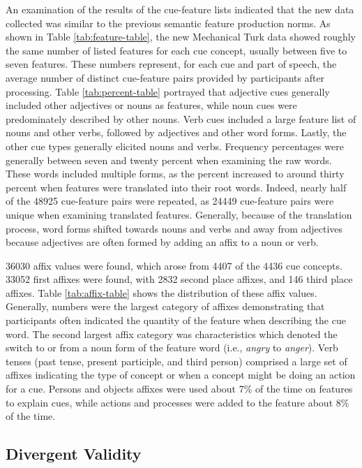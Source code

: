 \documentclass[english,,man]{apa6}
\begin{document}
An examination of the results of the cue-feature lists indicated that the new data collected was similar to the previous semantic feature production norms. As shown in Table \ref{tab:feature-table}, the new Mechanical Turk data showed roughly the same number of listed features for each cue concept, usually between five to seven features. These numbers represent, for each cue and part of speech, the average number of distinct cue-feature pairs provided by participants after processing. Table \ref{tab:percent-table} portrayed that adjective cues generally included other adjectives or nouns as features, while noun cues were predominately described by other nouns. Verb cues included a large feature list of nouns and other verbs, followed by adjectives and other word forms. Lastly, the other cue types generally elicited nouns and verbs. Frequency percentages were generally between seven and twenty percent when examining the raw words. These words included multiple forms, as the percent increased to around thirty percent when features were translated into their root words. Indeed, nearly half of the 48925 cue-feature pairs were repeated, as 24449 cue-feature pairs were unique when examining translated features. Generally, because of the translation process, word forms shifted towards nouns and verbs and away from adjectives because adjectives are often formed by adding an affix to a noun or verb.

36030 affix values were found, which arose from 4407 of the 4436 cue concepts. 33052 first affixes were found, with 2832 second place affixes, and 146 third place affixes. Table \ref{tab:affix-table} shows the distribution of these affix values. Generally, numbers were the largest category of affixes demonstrating that participants often indicated the quantity of the feature when describing the cue word. The second largest affix category was characteristics which denoted the switch to or from a noun form of the feature word (i.e., \emph{angry} to \emph{anger}). Verb tenses (past tense, present participle, and third person) comprised a large set of affixes indicating the type of concept or when a concept might be doing an action for a cue. Persons and objects affixes were used about 7\% of the time on features to explain cues, while actions and processes were added to the feature about 8\% of the time.

\hypertarget{divergent-validity}{%
\subsection{Divergent Validity}\label{divergent-validity}}
\end{document}
